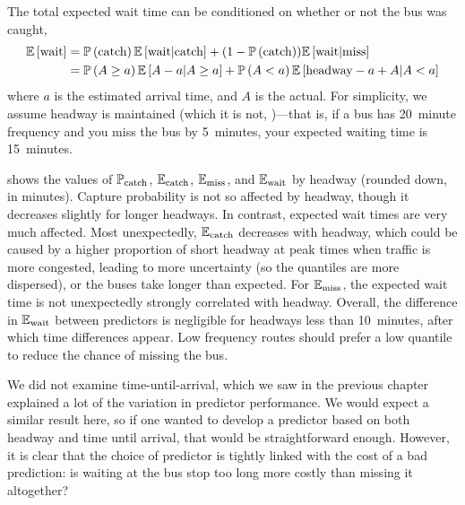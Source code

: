 The total expected wait time can be conditioned on whether or not the bus was caught,
\begin{equation}
\label{eq:eta_wait_conditional}
\begin{split}
\mathbb{E}\left[\text{wait}\right] &=
  \mathbb{P}\left(\text{catch}\right) \mathbb{E}\left[\text{wait}|\text{catch}\right] +
  (1 - \mathbb{P}\left(\text{catch}\right)) \mathbb{E}\left[\text{wait}|\text{miss}\right] \\
  &= \mathbb{P}\left(A \geq a\right) \mathbb{E}\left[A - a | A \geq a\right] +
  \mathbb{P}\left(A < a\right)\mathbb{E}\left[\text{headway} - a + A | A < a\right]
\end{split}
\end{equation}
where $a$ is the estimated arrival time, and $A$ is the actual. For simplicity, we assume headway is maintained (which it is not, \citet{})---that is, if a bus has 20~minute frequency and you miss the bus by 5~minutes, your expected waiting time is 15~minutes.

 shows the values of $\mathbb{P}_\text{catch}$, $\mathbb{E}_\text{catch}$, $\mathbb{E}_\text{miss}$, and $\mathbb{E}_\text{wait}$ by headway (rounded down, in minutes). Capture probability is not so affected by headway, though it decreases slightly for longer headways. In contrast, expected wait times are very much affected. Most unexpectedly, $\mathbb{E}_\text{catch}$ decreases with headway, which could be caused by a higher proportion of short headway at peak times when traffic is more congested, leading to more uncertainty (so the quantiles are more dispersed), or the buses take longer than expected. For $\mathbb{E}_\text{miss}$, the expected wait time is not unexpectedly strongly correlated with headway. Overall, the difference in $\mathbb{E}_\text{wait}$ between predictors is negligible for headways less than 10~minutes, after which time differences appear. Low frequency routes should prefer a low quantile to reduce the chance of missing the bus.


We did not examine time-until-arrival, which we saw in the previous chapter explained a lot of the variation in predictor performance. We would expect a similar result here, so if one wanted to develop a predictor based on both headway and time until arrival, that would be straightforward enough. However, it is clear that the choice of predictor is tightly linked with the cost of a bad prediction: is waiting at the bus stop too long more costly than missing it altogether?
